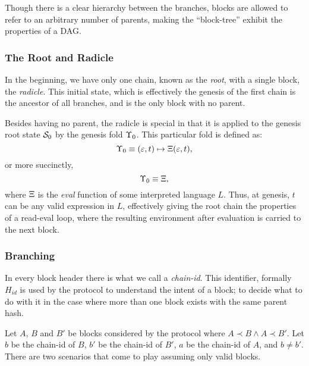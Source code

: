 Though there is a clear hierarchy between the branches, blocks are allowed to
refer to an arbitrary number of parents, making the ``block-tree'' exhibit the
properties of a DAG.


\subsubsection{The Root and Radicle}
\label{s:root}


In the beginning, we have only one chain, known as the \emph{root}, with a
single block, the \emph{radicle}. This initial state, which is effectively the
genesis of the first chain is the ancestor of all branches, and is the only
block with no parent.

Besides having no parent, the radicle is special in that it is applied to the
genesis root state $\mathcal{S}_0$ by the genesis fold $\Upsilon_{0}$. This particular
fold is defined as:
\[
    \Upsilon_{0} \equiv (\varepsilon, t) \mapsto \operatorname{\Xi} (\varepsilon, t),
\]
or more succinctly,
\[
    \Upsilon_0 \equiv \operatorname{\Xi},
\]
where $\operatorname{\Xi}$ is the \emph{eval} function of some interpreted language $L$.
Thus, at genesis, $t$ can be any valid expression in $L$, effectively giving
the root chain the properties of a read-eval loop, where the resulting
environment after evaluation is carried to the next block.



\subsubsection{Branching}

In every block header there is what we call a \emph{chain-id}. This identifier,
formally $H_{id}$ is used by the protocol to understand the intent of a block;
to decide what to do with it in the case where more than one block exists with
the same parent hash.

Let $A$, $B$ and $B'$ be blocks considered by the protocol where $A \prec B
\wedge A \prec B'$.  Let $b$ be the chain-id of $B$,  $b'$ be the chain-id of
$B'$, $a$ be the chain-id of $A$, and $b \neq b'$. There are two scenarios
that come to play assuming only valid blocks.

